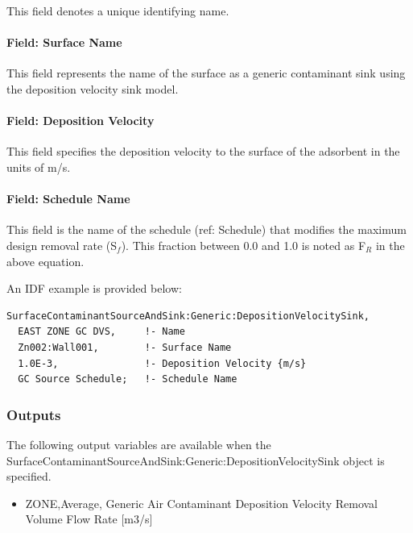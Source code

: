 This field denotes a unique identifying name.

\paragraph{Field: Surface Name}\label{field-surface-name-4-000}

This field represents the name of the surface as a generic contaminant sink using the deposition velocity sink model.

\paragraph{Field: Deposition Velocity}\label{field-deposition-velocity}

This field specifies the deposition velocity to the surface of the adsorbent in the units of m/s.

\paragraph{Field: Schedule Name}\label{field-schedule-name-9}

This field is the name of the schedule (ref: Schedule) that modifies the maximum design removal rate (S\(_{f}\)). This fraction between 0.0 and 1.0 is noted as F\(_{R}\) in the above equation.

An IDF example is provided below:

\begin{lstlisting}
SurfaceContaminantSourceAndSink:Generic:DepositionVelocitySink,
  EAST ZONE GC DVS,     !- Name
  Zn002:Wall001,        !- Surface Name
  1.0E-3,               !- Deposition Velocity {m/s}
  GC Source Schedule;   !- Schedule Name
\end{lstlisting}

\subsubsection{Outputs}\label{outputs-12-003}

The following output variables are available when the Surface\-Contaminant\-Source\-And\-Sink:\-Generic:\-Deposition\-Velocity\-Sink object is specified.

\begin{itemize}
    \tightlist
  \item
    ZONE,Average, Generic Air Contaminant Deposition Velocity Removal Volume Flow Rate {[}m3/s{]}
\end{itemize}

